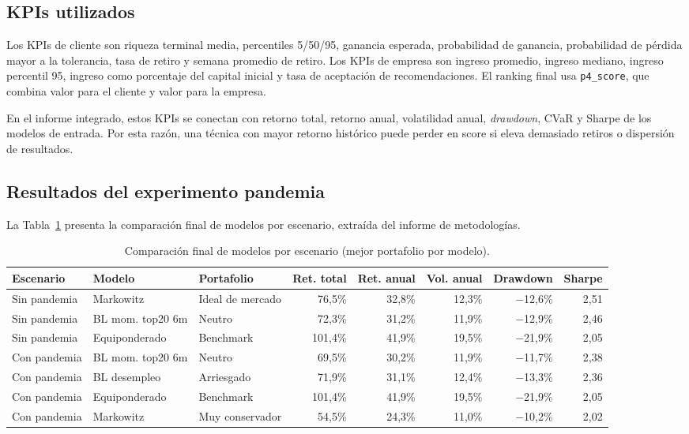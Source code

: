 \subsection*{KPIs utilizados}

Los KPIs de cliente son riqueza terminal media, percentiles 5/50/95, ganancia
esperada, probabilidad de ganancia, probabilidad de p\'erdida mayor a la
tolerancia, tasa de retiro y semana promedio de retiro. Los KPIs de empresa son
ingreso promedio, ingreso mediano, ingreso percentil 95, ingreso como porcentaje
del capital inicial y tasa de aceptaci\'on de recomendaciones. El ranking final
usa \texttt{p4\_score}, que combina valor para el cliente y valor para la
empresa.

En el informe integrado, estos KPIs se conectan con retorno total, retorno
anual, volatilidad anual, \textit{drawdown}, CVaR y Sharpe de los modelos de
entrada. Por esta raz\'on, una t\'ecnica con mayor retorno hist\'orico puede perder
en score si eleva demasiado retiros o dispersi\'on de resultados.

\subsection*{Resultados del experimento pandemia}

La Tabla~\ref{tab:anexo4_comparacion_modelos} presenta la comparaci\'on final de
modelos por escenario, extra\'ida del informe de metodolog\'ias.

\begin{table}[H]
\centering
\caption{Comparaci\'on final de modelos por escenario (mejor portafolio por modelo).}
\label{tab:anexo4_comparacion_modelos}
\small
\begin{adjustbox}{max width=\textwidth}
\begin{tabular}{@{}lllrrrrr@{}}
\toprule
Escenario & Modelo & Portafolio & Ret. total & Ret. anual & Vol. anual & Drawdown & Sharpe \\
\midrule
Sin pandemia & Markowitz & Ideal de mercado & 76,5\% & 32,8\% & 12,3\% & $-$12,6\% & 2,51 \\
Sin pandemia & BL mom. top20 6m & Neutro & 72,3\% & 31,2\% & 11,9\% & $-$12,9\% & 2,46 \\
Sin pandemia & Equiponderado & Benchmark & 101,4\% & 41,9\% & 19,5\% & $-$21,9\% & 2,05 \\
\midrule
Con pandemia & BL mom. top20 6m & Neutro & 69,5\% & 30,2\% & 11,9\% & $-$11,7\% & 2,38 \\
Con pandemia & BL desempleo & Arriesgado & 71,9\% & 31,1\% & 12,4\% & $-$13,3\% & 2,36 \\
Con pandemia & Equiponderado & Benchmark & 101,4\% & 41,9\% & 19,5\% & $-$21,9\% & 2,05 \\
Con pandemia & Markowitz & Muy conservador & 54,5\% & 24,3\% & 11,0\% & $-$10,2\% & 2,02 \\
\bottomrule
\end{tabular}
\end{adjustbox}
\end{table}

